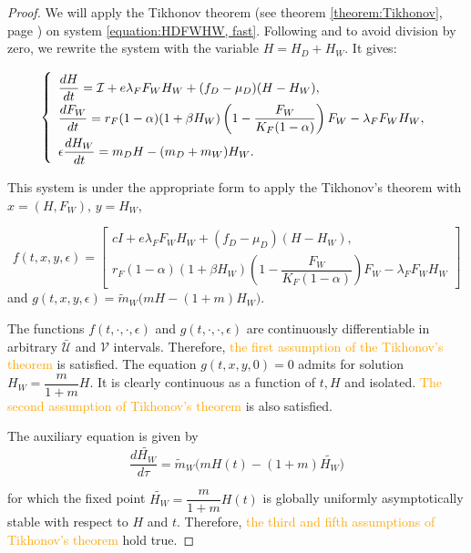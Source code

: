 \documentclass{article}
\newcommand{\lfw}{\lambda_{F}}
\newcommand{\lfw}{\lambda_{F}}
\newcommand{\cI}{\mathcal{I}}
\newcommand{\mW}{\tilde{m}_W}
\newcommand{\vdeux}[1]{\textcolor{orange}{#1}}
\theoremstyle{definition}
\theoremstyle{remark}
\begin{document}
\begin{proof}
We will apply the Tikhonov theorem (see theorem \ref{theorem:Tikhonov}, page \pageref{theorem:Tikhonov}) on system \eqref{equation:HDFWHW, fast}. Following \cite{banasiak_methods_2014} and to avoid division by zero, we rewrite the system with the variable $H = H_D + H_W$. It gives:

\begin{equation*} 
\def\arraystretch{2}
\left\{ 
\begin{array}{l}
\dfrac{dH}{dt}= \cI + e\lfw F_WH_W + (f_D - \mu_D)(H - H_W), \\
\dfrac{dF_W}{dt} = r_F(1- \alpha) (1+ \beta H_W) \left(1 - \dfrac{F_W}{K_F(1-\alpha)} \right) F_W - \lfw F_W H_W, \\
\epsilon \dfrac{dH_W}{dt}= m_D H - (m_D + m_W) H_W.
\end{array} \right.
\label{equation:HFWHW} 
\end{equation*}

This system 
is under the appropriate form to apply the Tikhonov's theorem with $x = (H, F_W)$, $y = H_W$,  

$$f(t,x,y,\epsilon) = \begin{bmatrix}
cI + e\lfw F_W H_W + (f_D - \mu_D) (H - H_W), \\
r_F(1- \alpha) (1+ \beta H_W) \left(1 - \dfrac{F_W}{K_F(1-\alpha)} \right) F_W - \lfw F_W H_W
\end{bmatrix}  $$
and $g(t,x,y,\epsilon) = \mW \Big(m H - (1 + m)H_W \Big) $.

The functions $f(t, \cdot, \cdot, \epsilon)$ and $g(t, \cdot, \cdot, \epsilon)$ are continuously differentiable in arbitrary $\mathcal{\bar{U}}$ and $\mathcal{V}$ intervals. Therefore, \vdeux{the first assumption of the Tikhonov's theorem} is satisfied. The equation $ g(t,x,y,0) =  0$ admits for solution $H_W = \dfrac{m}{1+m}H$. It is clearly continuous as a function of $t, H$ and isolated. \vdeux{The second assumption of Tikhonov's theorem} is also satisfied.

The auxiliary equation is given by
\begin{equation*}
\dfrac{d \tilde{H_W}}{d \tau} = \mW \Big(m H(t) - (1 + m)\tilde{H_W} \Big)
\end{equation*}

for which the fixed point $\tilde{H_W} = \dfrac{m}{1+m}H(t)$ is globally uniformly asymptotically stable with respect to $H$ and $t$. Therefore, \vdeux{the third and fifth assumptions of Tikhonov's theorem} hold true.


\end{proof}
\end{document}
